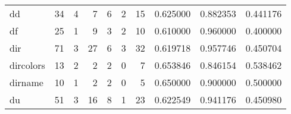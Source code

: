 \begin{longtable}{lrrrrrrrrr}
dd        &                                      34 &                                                  4 &                                                  7 &                                                  6 &                                                  2 &                                                 15 &                                           0.625000 &                               0.882353 &                             0.441176 \\
df        &                                      25 &                                                  1 &                                                  9 &                                                  3 &                                                  2 &                                                 10 &                                           0.610000 &                               0.960000 &                             0.400000 \\
dir       &                                      71 &                                                  3 &                                                 27 &                                                  6 &                                                  3 &                                                 32 &                                           0.619718 &                               0.957746 &                             0.450704 \\
dircolors &                                      13 &                                                  2 &                                                  2 &                                                  2 &                                                  0 &                                                  7 &                                           0.653846 &                               0.846154 &                             0.538462 \\
dirname   &                                      10 &                                                  1 &                                                  2 &                                                  2 &                                                  0 &                                                  5 &                                           0.650000 &                               0.900000 &                             0.500000 \\
du        &                                      51 &                                                  3 &                                                 16 &                                                  8 &                                                  1 &                                                 23 &                                           0.622549 &                               0.941176 &                             0.450980 \\

\end{longtable}
